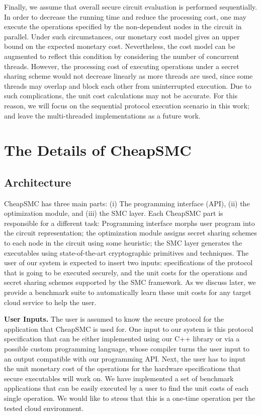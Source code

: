 \documentclass{llncs}
\newcommand{\sysname}{{CheapSMC}\xspace}
\begin{document}
Finally, we assume that overall secure circuit evaluation is performed sequentially. In order to decrease the running time and reduce the processing cost, one may execute the operations specified by the non-dependent nodes in the circuit in parallel. Under such circumstances, our monetary cost model gives an upper bound on the expected monetary cost. Nevertheless, the cost model can be augmented to reflect this condition by considering the number of concurrent threads. However, the processing cost of executing operations under a secret sharing scheme would not decrease linearly as more threads are used, since some threads may overlap and block each other from uninterrupted execution. Due to such complications, the unit cost calculations may not be accurate.  For this reason, we will focus on the sequential protocol execution scenario in this work; and leave the multi-threaded implementations as a future work.


\vspace{-0.3cm}
\section{The Details of \sysname}
\label{sec:system}

\subsection{Architecture}
\label{sec:system:arch}

\sysname has three main parts: (i) The programming interface (API), (ii) the optimization module, and (iii) the SMC layer. Each \sysname part is responsible for a different task: Programming interface morphs user program into the circuit representation; the optimization module assigns secret sharing schemes to each node in the circuit using some heuristic; the SMC layer generates the executables using state-of-the-art cryptographic primitives and techniques. The user of our system is expected to insert two inputs:  specifications of the protocol that is going to be executed securely, and the unit costs for the operations and secret sharing schemes supported by the SMC framework. As we discuss later, we provide a benchmark suite to automatically learn these unit costs for any target cloud service to help the user. 

\textbf{User Inputs.} The user is assumed to know the secure protocol for the application that \sysname is used for. One input to our system is this protocol specification that can be either implemented using our C++ library or via a possible custom programming language, whose compiler turns the user input to an output compatible with our programming API. Next, the user has to input the unit monetary cost of the operations for the hardware specifications that secure executables will work on. We have implemented a set of benchmark applications that can be easily executed by a user to find the unit costs of each single operation. We would like to stress that this is a one-time operation per the tested cloud environment.  
 
\end{document}
